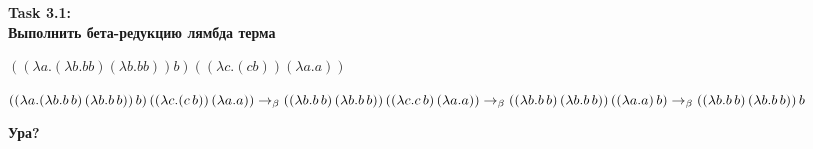 \documentclass[12pt]{article}
\begin{document}
  \Large 
  \begin{center}
    \textbf{Task 3.1: \\Выполнить бета-редукцию лямбда терма}
    \begin{flushright}
      $((\lambda a.(\lambda b.b b) (\lambda b.b b)) b)
      ((\lambda c.(c b)) (\lambda a.a))$
    \end{flushright}
  \end{center}

  $\\*((\lambda a.(\lambda b.b\,b)\,(\lambda b.b\,b))\,b)\,((\lambda c.(c\,b))\,(\lambda a.a)) \to_\beta
  \\*((\lambda b.b\,b)\,(\lambda b.b\,b))\,((\lambda c.c\,b)\,(\lambda a.a)) \to_\beta
  \\*((\lambda b.b\,b)\,(\lambda b.b\,b))\,((\lambda a.a)\,b) \to_\beta 
  \\*((\lambda b.b\,b)\,(\lambda b.b\,b))\,b$
  
  \begin{flushleft}
    \textbf{Ура?}
  \end{flushleft}
  
\end{document}
